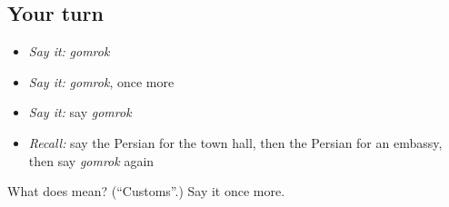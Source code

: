 \subsection*{Your turn}
\begin{itemize}
\raggedright
  \item \emph{Say it:} \emph{gomrok}
  \item \emph{Say it:} \emph{gomrok}, once more
  \item \emph{Say it:} say \emph{gomrok}
  \item \emph{Recall:} say the Persian for the town hall, then the Persian for an embassy, then say \emph{gomrok} again
\end{itemize}

\begin{tcolorbox}[breakable,colback=teal!4,colframe=teal!35!black,title={Before you move on}]
What does  mean? (\textquotedblleft{}Customs\textquotedblright{}.) Say it once more.
\end{tcolorbox}
